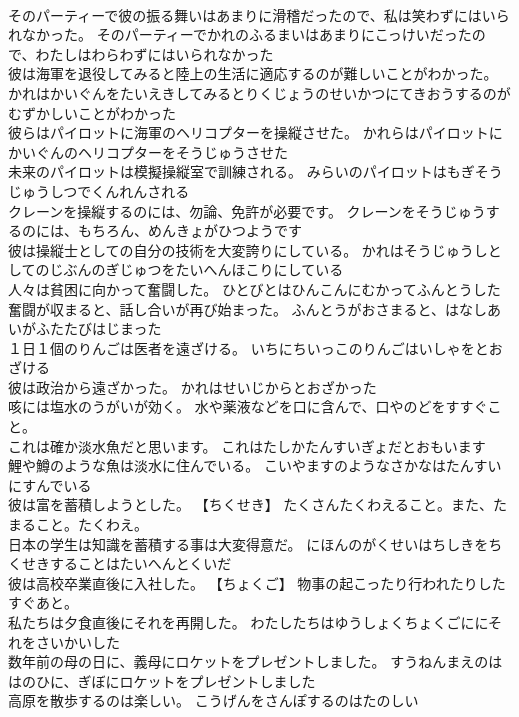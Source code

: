 \documentclass[8pt]{extreport}
\begin{document}
\begin{CJK}{UTF8}{min}
\\	そのパーティーで彼の振る舞いはあまりに滑稽だったので、私は笑わずにはいられなかった。	そのパーティーでかれのふるまいはあまりにこっけいだったので、わたしはわらわずにはいられなかった 
\\	彼は海軍を退役してみると陸上の生活に適応するのが難しいことがわかった。	かれはかいぐんをたいえきしてみるとりくじょうのせいかつにてきおうするのがむずかしいことがわかった 
\\	彼らはパイロットに海軍のヘリコプターを操縦させた。	かれらはパイロットにかいぐんのヘリコプターをそうじゅうさせた 
\\	未来のパイロットは模擬操縦室で訓練される。	みらいのパイロットはもぎそうじゅうしつでくんれんされる 
\\	クレーンを操縦するのには、勿論、免許が必要です。	クレーンをそうじゅうするのには、もちろん、めんきょがひつようです 
\\	彼は操縦士としての自分の技術を大変誇りにしている。	かれはそうじゅうしとしてのじぶんのぎじゅつをたいへんほこりにしている 
\\	人々は貧困に向かって奮闘した。	ひとびとはひんこんにむかってふんとうした 
\\	奮闘が収まると、話し合いが再び始まった。	ふんとうがおさまると、はなしあいがふたたびはじまった 
\\	１日１個のりんごは医者を遠ざける。	いちにちいっこのりんごはいしゃをとおざける 
\\	彼は政治から遠ざかった。	かれはせいじからとおざかった 
\\	咳には塩水のうがいが効く。	水や薬液などを口に含んで、口やのどをすすぐこと。
\\	これは確か淡水魚だと思います。	これはたしかたんすいぎょだとおもいます 
\\	鯉や鱒のような魚は淡水に住んでいる。	こいやますのようなさかなはたんすいにすんでいる 
\\	彼は富を蓄積しようとした。	【ちくせき】 たくさんたくわえること。また、たまること。たくわえ。
\\	日本の学生は知識を蓄積する事は大変得意だ。	にほんのがくせいはちしきをちくせきすることはたいへんとくいだ 
\\	彼は高校卒業直後に入社した。	【ちょくご】 物事の起こったり行われたりしたすぐあと。
\\	私たちは夕食直後にそれを再開した。	わたしたちはゆうしょくちょくごににそれをさいかいした 
\\	数年前の母の日に、義母にロケットをプレゼントしました。	すうねんまえのははのひに、ぎぼにロケットをプレゼントしました 
\\	高原を散歩するのは楽しい。	こうげんをさんぽするのはたのしい 

\end{CJK}
\end{document}
